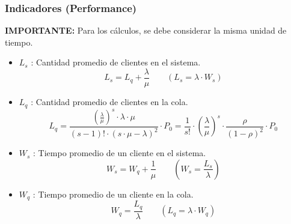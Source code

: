 \documentclass{templateNote}
\begin{document}
\newpage
\subsubsection{Indicadores (Performance)}
\textbf{IMPORTANTE:} Para los cálculos, se debe considerar la misma unidad de tiempo.
\begin{itemize}
    \item $L_s$ : Cantidad promedio de clientes en el sistema.
    \begin{equation*}
        L_s = L_q + \frac{\lambda}{\mu} \qquad (L_s = \lambda \cdot W_s)
    \end{equation*}

    \item $L_q$ : Cantidad promedio de clientes en la cola.
    \begin{equation*}
        L_q = \frac{\left(\frac{\lambda}{\mu}\right)^s \cdot \lambda \cdot \mu}{(s-1)! \cdot (s \cdot \mu - \lambda)^2} \cdot P_0 = \frac{1}{s!} \cdot \left(\frac{\lambda}{\mu}\right)^s \cdot \frac{\rho}{(1-\rho)^2} \cdot P_0
    \end{equation*}

    \item $W_s$ : Tiempo promedio de un cliente en el sistema.
    \begin{equation*}
        W_s = W_q + \frac{1}{\mu} \qquad (W_s = \frac{L_s}{\lambda})
    \end{equation*}

    \item $W_q$ : Tiempo promedio de un cliente en la cola.
    \begin{equation*}
        W_q = \frac{L_q}{\lambda} \qquad (L_q = \lambda \cdot W_q)
    \end{equation*}
\end{itemize}
\end{document}
